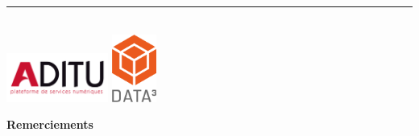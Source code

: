 \begin{sloppypar}
\begin{titlepage}
\begin{center}
        \vspace{0.5cm}
        \LARGE{\poste}
          
        \vspace{2.5 cm}
        \large{\auteurDocument}\\
        \large{\dateRendu}\\

        \vspace{4 cm}
         

        \vspace{1 cm}


        \noindent\rule[0.25\baselineskip]{\textwidth}{1pt}\\
        
        \href{https://www.aditu.fr/}{\includegraphics[width=0.25\textwidth]{images/logo/aditu.png}}
        \quad \quad
        \href{https://www.datacube-services.fr/}{\includegraphics[width=0.11\textwidth]{images/logo/data3.png}}\\
      
    \end{center}
\setcounter{page}{0}
\end{titlepage}

\restoregeometry

\newpage

\thispagestyle{empty}
\mbox{}

\newpage

\centerline{\huge{\textbf{Remerciements}}}

\vspace{1 cm}


\end{sloppypar}
